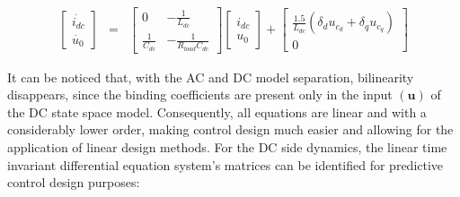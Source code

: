     \begin{equation}
        \begin{array}{rcl}
            \begin{bmatrix}
                \dot{i_{dc}}\\
                \dot{u_{0}}
            \end{bmatrix}&=&
            \begin{bmatrix}
                0&  -\frac{1}{L_{dc}}\\
                \frac{1}{C_{dc}}&   -\frac{1}{R_{load}C_{dc}}
            \end{bmatrix}
            \begin{bmatrix}
                i_{dc}\\
                u_0
            \end{bmatrix}+
            \begin{bmatrix}
                \frac{1.5}{L_{dc}}(\delta_du_{c_d}+\delta_qu_{c_q})\\
                0
            \end{bmatrix}
        \end{array}
        \label{EMPC:equ:mtx_DC}
    \end{equation}

    It can be noticed that, with the AC and DC model separation, bilinearity disappears, since the binding coefficients are present only in the input $(\boldsymbol{u})$ of the DC state space model. Consequently, all equations are linear and with a considerably lower order, making control design much easier and allowing for the application of linear design methods. For the DC side dynamics, the linear time invariant differential equation system’s matrices can be identified for predictive control design purposes:

